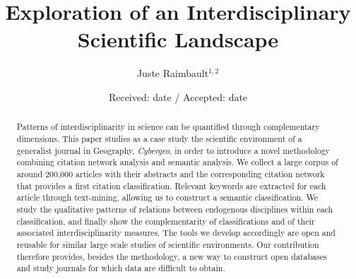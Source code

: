 

\title{Exploration of an Interdisciplinary Scientific Landscape}


\author{Juste Raimbault$^{1,2}$}



\date{Received: date / Accepted: date}



\maketitle

\begin{abstract}
Patterns of interdisciplinarity in science can be quantified through complementary dimensions. This paper studies as a case study the scientific environment of a generalist journal in Geography, \emph{Cybergeo}, in order to introduce a novel methodology combining citation network analysis and semantic analysis. We collect a large corpus of around 200,000 articles with their abstracts and the corresponding citation network that provides a first citation classification. Relevant keywords are extracted for each article through text-mining, allowing us to construct a semantic classification. We study the qualitative patterns of relations between endogenous disciplines within each classification, and finally show the complementarity of classifications and of their associated interdisciplinarity measures. The tools we develop accordingly are open and reusable for similar large scale studies of scientific environments. Our contribution therefore provides, besides the methodology, a new way to construct open databases and study journals for which data are difficult to obtain.
\end{abstract}

